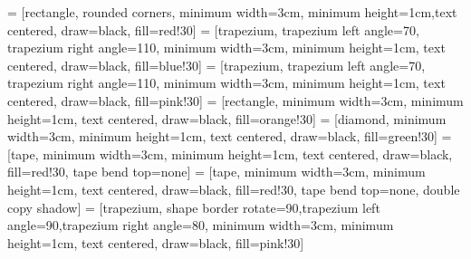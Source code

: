  = [rectangle, rounded corners, minimum width=3cm, minimum height=1cm,text centered, draw=black, fill=red!30]
 = [trapezium, trapezium left angle=70, trapezium right angle=110, minimum width=3cm, minimum height=1cm, text centered, draw=black, fill=blue!30]
 = [trapezium, trapezium left angle=70, trapezium right angle=110, minimum width=3cm, minimum height=1cm, text centered, draw=black, fill=pink!30]
 = [rectangle, minimum width=3cm, minimum height=1cm, text centered, draw=black, fill=orange!30]
 = [diamond, minimum width=3cm, minimum height=1cm, text centered, draw=black, fill=green!30]
 = [tape, minimum width=3cm, minimum height=1cm, text centered, draw=black, fill=red!30, tape bend top=none]
 = [tape, minimum width=3cm, minimum height=1cm, text centered, draw=black, fill=red!30, tape bend top=none, double copy shadow]
 = [trapezium, shape border rotate=90,trapezium left angle=90,trapezium right angle=80, minimum width=3cm, minimum height=1cm, text centered, draw=black, fill=pink!30]